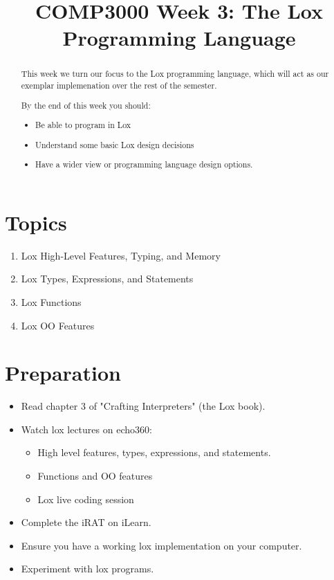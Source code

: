 \documentclass[twoside=false, DIV=14]{scrartcl}
\title{\color{redish} \vspace{-1em}COMP3000 Week 3: The Lox Programming Language}
\begin{document}
{\color{blackish}\maketitle}\vspace{-7em}

\begin{abstract}
This week we turn our focus to the Lox programming language, which will act as our exemplar implemenation over the rest of the semester.  

By the end of this week you should:
\begin{itemize}
    \item Be able to program in Lox
    \item Understand some basic Lox design decisions
    \item Have a wider view or programming language design options.
\end{itemize}
\end{abstract}

\section*{Topics}
\begin{enumerate}
\item Lox High-Level Features, Typing, and Memory
\item Lox Types, Expressions, and Statements
\item Lox Functions
\item Lox OO Features
\end{enumerate}

\section*{Preparation}
\begin{itemize}
\item Read chapter 3 of "Crafting Interpreters" (the Lox book).
\item Watch lox lectures on echo360:
  \begin{itemize}
  \item High level features, types, expressions, and statements.
  \item Functions and OO features
  \item Lox live coding session
  \end{itemize}
\item Complete the iRAT on iLearn.
\item Ensure you have a working lox implementation on your computer.
\item Experiment with lox programs.
\end{itemize}
\end{document}
